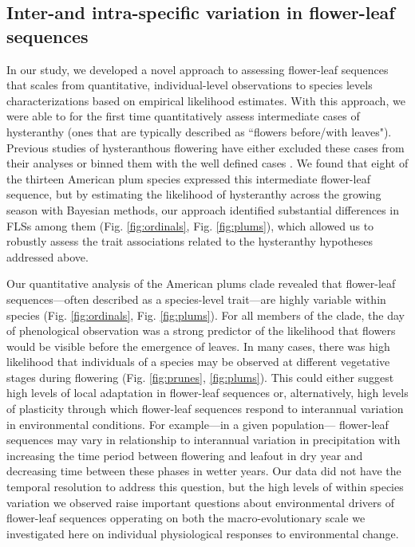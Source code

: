 \documentclass{article}[11pt]
\begin{document}
{\subsection*{Inter-and intra-specific variation in flower-leaf sequences}
In our study, we developed a novel approach to assessing flower-leaf sequences that scales from quantitative, individual-level observations to species levels characterizations based on empirical likelihood estimates. With this approach, we were able to for the first time quantitatively assess intermediate cases of hysteranthy (ones that are typically described as ``flowers before/with leaves"). Previous studies of hysteranthous flowering have either excluded these cases from their analyses  \citep[e.g.;][]{Gougherty2018} or binned them with the well defined cases \citep[e.g.;][]{Buonaiuto2020}. We found that eight of the thirteen American plum species expressed this intermediate flower-leaf sequence, but by estimating the likelihood of hysteranthy across the growing season with Bayesian methods, our approach identified substantial differences in FLSs among them (Fig. \ref{fig:ordinals}, Fig. \ref{fig:plums}), which allowed us to robustly assess the trait associations related to the hysteranthy hypotheses addressed above.

Our quantitative analysis of the American plums clade revealed that flower-leaf sequences---often described as a species-level trait---are highly variable within species (Fig. \ref{fig:ordinals}, Fig. \ref{fig:plums}). For all members of the clade, the day of phenological observation was a strong predictor of the likelihood that flowers would be visible before the emergence of leaves. In many cases, there was high likelihood that individuals of a species may be observed at different vegetative stages during flowering (Fig. \ref{fig:prunes}, \ref{fig:plums}). This could either suggest high levels of local adaptation in flower-leaf sequences or, alternatively, high levels of plasticity through which flower-leaf sequences respond to interannual variation in environmental conditions. For example---in a given population--- flower-leaf sequences may vary in relationship to interannual variation in precipitation with increasing the time period between flowering and leafout in dry year and decreasing time between these phases in wetter years. Our data did not have the temporal resolution to address this question, but the high levels of within species variation we observed raise important questions about environmental drivers of flower-leaf sequences opperating on both the macro-evolutionary scale we investigated here on individual physiological responses to environmental change. 

}
\end{document}
